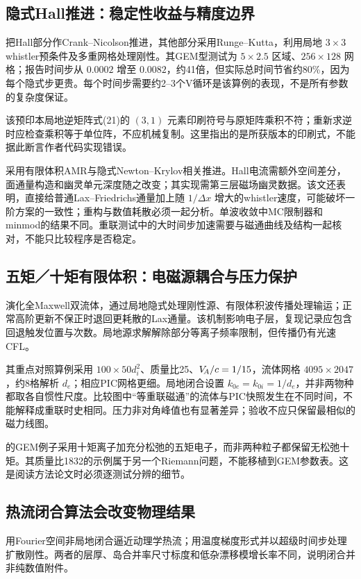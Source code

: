 \documentclass[UTF8,a4paper,11pt,openany,fontset=fandol]{ctexbook}
\begin{document}
\subsection{隐式Hall推进：稳定性收益与精度边界}
\citet{Arnold2008}把Hall部分作Crank--Nicolson推进，其他部分采用Runge--Kutta，利用局地 $3\times3$ whistler预条件及多重网格处理刚性。其GEM型测试为 $5\times2.5$ 区域、$256\times128$ 网格；报告时间步从 $0.0002$ 增至 $0.0082$，约41倍，但实际总时间节省约80\%，因为每个隐式步更贵。每个时间步需要约2--3个V循环是该算例的表现，不是所有参数的复杂度保证。

该预印本局地逆矩阵式(21)的 $(3,1)$ 元素印刷符号与原矩阵乘积不符；重新求逆时应检查乘积等于单位阵，不应机械复制。这里指出的是所获版本的印刷式，不能据此断言作者代码实现错误。

\citet{Toth2008}采用有限体积AMR与隐式Newton--Krylov相关推进。Hall电流需额外空间差分，面通量构造和幽灵单元深度随之改变；其实现需第三层磁场幽灵数据。该文还表明，直接给普通Lax--Friedrichs通量加上随 $1/\Delta x$ 增大的whistler速度，可能破坏一阶方案的一致性；重构与数值耗散必须一起分析。单波收敛中MC限制器和minmod的结果不同。重联测试中的大时间步加速需要与磁通曲线及结构一起核对，不能只比较程序是否稳定。

\subsection{五矩／十矩有限体积：电磁源耦合与压力保护}
\citet{Wang2015}演化全Maxwell双流体，通过局地隐式处理刚性源、有限体积波传播处理输运；正常高阶更新不保正时退回更耗散的Lax通量。该机制影响电子层，复现记录应包含回退触发位置与次数。局地源求解解除部分等离子频率限制，但传播仍有光速CFL。

其重点对照算例采用 $100\times50d_i^2$、质量比25、$V_{\!A}/c=1/15$，流体网格 $4095\times2047$，约8格解析 $d_e$；相应PIC网格更细。局地闭合设置 $k_{0e}=k_{0i}=1/d_e$，并非两物种都取各自惯性尺度。比较图中“等重联磁通”的流体与PIC快照发生在不同时间，不能解释成重联时史相同。压力非对角峰值也有显著差异；验收不应只保留最相似的磁力线图。

\citet{Hakim2008}的GEM例子采用十矩离子加充分松弛的五矩电子，而非两种粒子都保留无松弛十矩。其质量比1832的示例属于另一个Riemann问题，不能移植到GEM参数表。这是阅读方法论文时必须逐测试分辨的细节。

\subsection{热流闭合算法会改变物理结果}
\citet{Ng2017}用Fourier空间非局地闭合逼近动理学热流；\citet{Ng2020}用温度梯度形式并以超级时间步处理扩散刚性。两者的层厚、岛合并率尺寸标度和低杂漂移模增长率不同，说明闭合并非纯数值附件。
\end{document}
